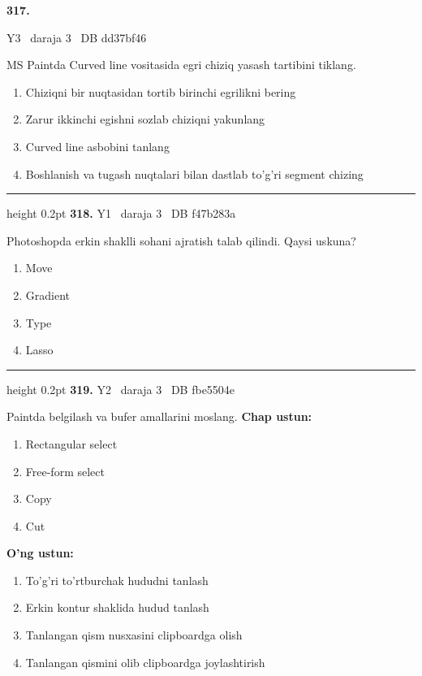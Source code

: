 \documentclass[10pt,a4paper,oneside]{article}
\begin{document}
\hypertarget{q317}{\textbf{\color{ink}317.}}  {\color{muted}\scriptsize Y3 \textbullet\ daraja 3 \textbullet\ DB dd37bf46}
\par
MS Paintda Curved line vositasida egri chiziq yasash tartibini tiklang.
\begin{enumerate}[label=\Alph*),leftmargin=9mm]
\item Chiziqni bir nuqtasidan tortib birinchi egrilikni bering
\item Zarur ikkinchi egishni sozlab chiziqni yakunlang
\item Curved line asbobini tanlang
\item Boshlanish va tugash nuqtalari bilan dastlab to'g'ri segment chizing
\end{enumerate}
\vspace{2mm}\hrule height 0.2pt \vspace{4mm}
\hypertarget{q318}{\textbf{\color{ink}318.}}  {\color{muted}\scriptsize Y1 \textbullet\ daraja 3 \textbullet\ DB f47b283a}
\par
Photoshopda erkin shaklli sohani ajratish talab qilindi. Qaysi uskuna?
\begin{enumerate}[label=\Alph*),leftmargin=9mm]
\item Move
\item Gradient
\item Type
\item Lasso
\end{enumerate}
\vspace{2mm}\hrule height 0.2pt \vspace{4mm}
\hypertarget{q319}{\textbf{\color{ink}319.}}  {\color{muted}\scriptsize Y2 \textbullet\ daraja 3 \textbullet\ DB fbe5504e}
\par
Paintda belgilash va bufer amallarini moslang.
\textbf{\footnotesize Chap ustun:}
\begin{enumerate}[label=\arabic*),leftmargin=9mm]
\item Rectangular select
\item Free-form select
\item Copy
\item Cut
\end{enumerate}
\textbf{\footnotesize O'ng ustun:}
\begin{enumerate}[label=\Alph*),leftmargin=9mm]
\item To'g'ri to'rtburchak hududni tanlash
\item Erkin kontur shaklida hudud tanlash
\item Tanlangan qism nusxasini clipboardga olish
\item Tanlangan qismini olib clipboardga joylashtirish
\end{enumerate}
\end{document}
